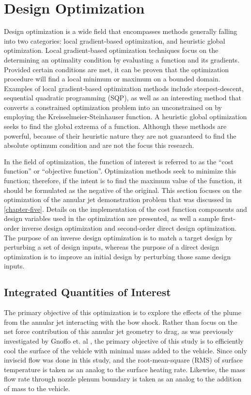 \chapter{Design Optimization}
\label{chapter-six}

Design optimization is a wide field that encompasses methods generally falling
into two categories: local gradient-based optimization, and heuristic global
optimization.  Local gradient-based optimization techniques focus on the
determining an optimality condition by evaluating a function and its gradients.
Provided certain conditions are met, it can be proven that the optimization
procedure will find a local minimum or maximum on a bounded domain.  Examples of
local gradient-based optimization methods include
steepest-descent\cite{fletcher1963rapidly}, sequential quadratic programming
(SQP)\cite{SNOPT-alg}, as well as an interesting method that converts a
constrained optimization problem into an unconstrained on by employing the
Kreisselmeier-Steinhauser function\cite{wrenn1989indirect}.  A heuristic global
optimization seeks to find the global extrema of a function.  Although these
methods are powerful, because of their heuristic nature they are not guaranteed
to find the absolute optimum condition and are not the focus this research.

In the field of optimization, the function of interest is referred to as the
``cost function'' or ``objective function''.  Optimization methods seek to
minimize this function; therefore, if the intent is to find the maximum value
of the function, it should be formulated as the negative of the original.  This
section focuses on the optimization of the annular jet demonstration problem
that was discussed in \cref{chapter-five}.  Details on the implementation of the
cost function components and design variables used in the optimization are
presented, as well a sample first-order inverse design optimization and
second-order direct design optimization.  The purpose of an inverse design
optimization is to match a target design by perturbing a set of design inputs,
whereas the purpose of a direct design optimization is to improve an initial
design by perturbing those same design inputs.

\section{Integrated Quantities of Interest}

The primary objective of this optimization is to explore the effects of the plume
from the annular jet interacting with the bow shock.  Rather than focus on the
net force contribution of this annular jet geometry to drag, as was previously
investigated by Gnoffo et. al \cite{gnoffo2016tapping}, the primary objective of
this study is to efficiently cool the surface of the vehicle with minimal mass
added to the vehicle.  Since only inviscid flow was done in this study, and the
root-mean-square (RMS) of surface temperature is taken as an analog to the
surface heating rate.  Likewise, the mass flow rate through nozzle plenum
boundary is taken as an analog to the addition of mass to the vehicle.

